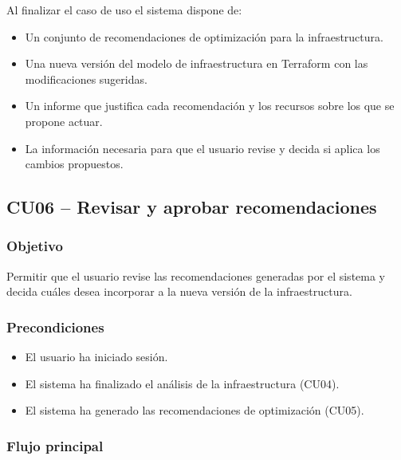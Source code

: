 Al finalizar el caso de uso el sistema dispone de:

\begin{itemize}
\item Un conjunto de recomendaciones de optimización para la infraestructura.
\item Una nueva versión del modelo de infraestructura en Terraform con las modificaciones sugeridas.
\item Un informe que justifica cada recomendación y los recursos sobre los que se propone actuar.
\item La información necesaria para que el usuario revise y decida si aplica los cambios propuestos.
\end{itemize}

\subsection{CU06 -- Revisar y aprobar recomendaciones}

\subsubsection*{Objetivo}

Permitir que el usuario revise las recomendaciones generadas por el sistema y decida cuáles desea incorporar a la nueva versión de la infraestructura.

\subsubsection*{Precondiciones}

\begin{itemize}
\item El usuario ha iniciado sesión.
\item El sistema ha finalizado el análisis de la infraestructura (CU04).
\item El sistema ha generado las recomendaciones de optimización (CU05).
\end{itemize}

\subsubsection*{Flujo principal}

